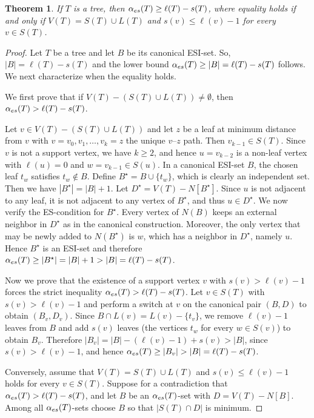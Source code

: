 \documentclass[10pt,a4paper]{amsart}
\newtheorem{theorem}{Theorem}
\newcommand{\es}{\alpha_{\rm es}}
\begin{document}
\begin{theorem}
\label{tree-lower}
If $T$ is a tree, then $\es(T)\geq \ell(T)-s(T)$, where equality holds if and only if $V(T)=S(T)\cup L(T)$ and $s(v) \leq \ell(v)-1$ for every $v\in S(T)$.
\end{theorem}

\begin{proof}
Let $T$ be a tree and let $B$ be its canonical ESI-set.  So,  $|B|=\ell(T)-s(T)$ and the lower bound $\es(T)\geq |B|=\ell(T)-s(T)$ follows. 
We next characterize when the equality holds.

We first prove that if $V(T)-(S(T)\cup L(T))\neq \emptyset$, then $\es(T)>\ell(T)-s(T)$.

Let $v\in V(T)-(S(T)\cup L(T))$ and let $z$ be a leaf at minimum distance from $v$ with $v=v_0,v_1,\dots,v_k=z$ the unique $v$--$z$ path. Then $v_{k-1}\in S(T)$. Since $v$ is not a support vertex, we have $k\ge 2$, and hence $u=v_{k-2}$ is a non-leaf vertex with $\ell(u)=0$ and $w=v_{k-1}\in S(u)$. 
In a canonical ESI-set $B$, the chosen leaf $t_w$ satisfies $t_w\notin B$. Define $B^\star=B\cup\{t_w\}$, which is clearly an independent set. Then we have $|B^\star|=|B|+1$. Let $D^\star=V(T)-N[B^\star]$. Since $u$ is not adjacent to any leaf, it is not adjacent to any vertex of $B^\star$, and thus $u\in D^\star$.
We now verify the ES-condition for $B^\star$. Every vertex of $N(B)$ keeps an external neighbor in $D^\star$ as in the canonical construction. Moreover, the only vertex that may be newly added to $N(B^\star)$ is $w$, 
which has a neighbor in $D^\star$, namely $u$. Hence $B^\star$ is an ESI-set and therefore $\es(T)\ge |B^\star|=|B|+1>|B|=\ell(T)-s(T)$.

Now we prove that the existence of a support vertex $v$ with $s(v)>\ell(v)-1$ forces the strict inequality $\es(T)>\ell(T)-s(T)$. Let $v\in S(T)$ with $s(v)>\ell(v)-1$ and perform a switch at $v$ on the canonical pair $(B,D)$ to obtain $(B_v,D_v)$.
Since $B\cap L(v)=L(v)-\{t_v\}$, we remove $\ell(v)-1$ leaves from $B$ and add $s(v)$
leaves (the vertices $t_w$ for every $w\in S(v)$) to obtain $B_v$. Therefore
$|B_v|=|B|-(\ell(v)-1)+s(v) > |B|$, since $s(v)>\ell(v)-1$, 
and hence $\es(T)\ge |B_v|>|B|=\ell(T)-s(T)$. 

Conversely, assume that $V(T)=S(T)\cup L(T)$ and $s(v)\le \ell(v)-1$ holds for every $v\in S(T)$.
Suppose for a contradiction that $\es(T)>\ell(T)-s(T)$, and let $B$ be an $\es(T)$-set with
$D=V(T)-N[B]$. Among all $\es(T)$-sets choose $B$ so that $|S(T)\cap D|$ is minimum.


\end{proof}
\end{document}
